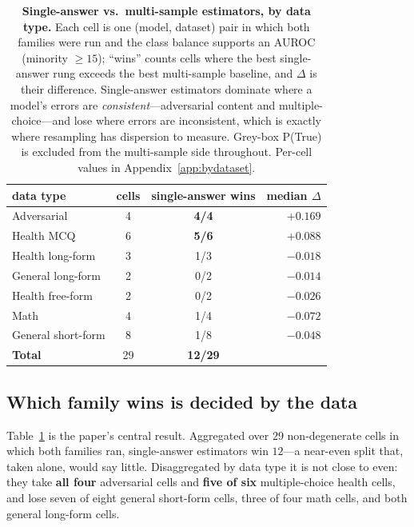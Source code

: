 \documentclass[11pt]{article}
\begin{document}
\begin{table}[t]
\centering\small
\begin{tabular}{lccr}
\toprule
data type & cells & single-answer wins & median $\Delta$ \\
\midrule
Adversarial      & 4 & \textbf{4/4} & $+0.169$ \\
Health MCQ       & 6 & \textbf{5/6} & $+0.088$ \\
Health long-form & 3 & 1/3 & $-0.018$ \\
General long-form& 2 & 0/2 & $-0.014$ \\
Health free-form & 2 & 0/2 & $-0.026$ \\
Math             & 4 & 1/4 & $-0.072$ \\
General short-form& 8 & 1/8 & $-0.048$ \\
\midrule
\textbf{Total}   & 29 & \textbf{12/29} & \\
\bottomrule
\end{tabular}
\caption{\textbf{Single-answer vs.\ multi-sample estimators, by data type.} Each cell is one
(model, dataset) pair in which both families were run and the class balance supports an AUROC
(minority $\ge15$); ``wins'' counts cells where the best single-answer rung exceeds the best
multi-sample baseline, and $\Delta$ is their difference. Single-answer estimators dominate where
a model's errors are \emph{consistent}---adversarial content and multiple-choice---and lose where
errors are inconsistent, which is exactly where resampling has dispersion to measure. Grey-box
P(True) is excluded from the multi-sample side throughout. Per-cell values in
Appendix~\ref{app:bydataset}.}
\label{tab:family}
\end{table}

\subsection{Which family wins is decided by the data}\label{sec:family}
Table~\ref{tab:family} is the paper's central result. Aggregated over $29$ non-degenerate cells
in which both families ran, single-answer estimators win $12$---a near-even split that, taken
alone, would say little. Disaggregated by data type it is not close to even: they take
\textbf{all four} adversarial cells and \textbf{five of six} multiple-choice health cells, and
lose seven of eight general short-form cells, three of four math cells, and both general
long-form cells.
\end{document}
